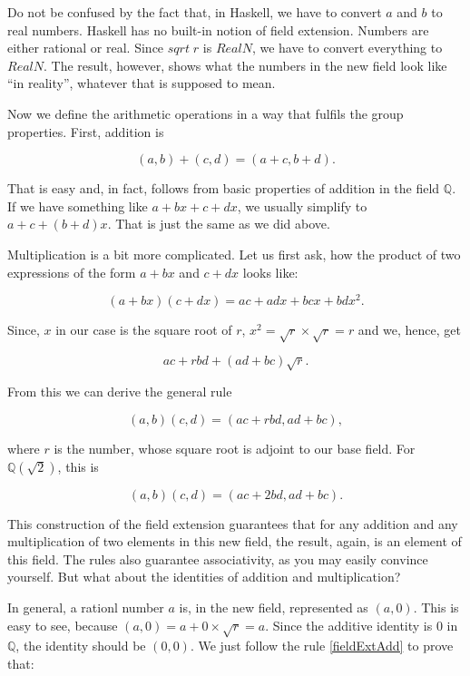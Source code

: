 \documentclass[tikz]{scrreprt}
\newcommand{\Conid}[1]{\mathit{#1}}
\newcommand{\Varid}[1]{\mathit{#1}}
\begin{document}
Do not be confused by the fact
that, in Haskell, we have to convert $a$ and $b$ to real numbers.
Haskell has no built-in notion of field extension.
Numbers are either rational or real. Since \ensuremath{\Varid{sqrt}\;\Varid{r}} is \ensuremath{\Conid{RealN}},
we have to convert
everything to \ensuremath{\Conid{RealN}}. The result, however, shows
what the numbers in the new field look like ``in reality'',
whatever that is supposed to mean.

Now we define the arithmetic operations in a way that fulfils 
the group properties. First, addition is

\begin{equation}\label{fieldExtAdd}
(a,b) + (c,d) = (a+c,b+d).
\end{equation}

That is easy and, in fact, follows from basic properties
of addition in the field $\mathbb{Q}$.
If we have something like $a+bx+c+dx$, we usually simplify to
$a+c+(b+d)x$. That is just the same as we did above.

Multiplication is a bit more complicated.
Let us first ask, how the product of two expressions
of the form $a+bx$ and $c+dx$ looks like:

\[
(a+bx)(c+dx)=ac+adx+bcx+bdx^2.
\]

Since, $x$ in our case is the square root of $r$, 
$x^2=\sqrt{r}\times\sqrt{r}=r$ 
and we, hence, get

\[
ac+rbd+(ad+bc)\sqrt{r}.
\]

From this we can derive the general rule

\begin{equation}\label{fieldExtMul}
(a,b)(c,d) = (ac+rbd,ad+bc),
\end{equation}

where $r$ is the number, whose square root is adjoint to our base field.
For $\mathbb{Q}(\sqrt{2})$, this is 

\begin{equation}
(a,b)(c,d) = (ac+2bd,ad+bc).
\end{equation}

This construction of the field extension guarantees
that for any addition and any multiplication 
of two elements in this new field, the result, again,
is an element of this field.
The rules also guarantee associativity,
as you may easily convince yourself.
But what about the identities of addition and multiplication?

In general, a rationl number $a$ is, in the new field,
represented as $(a,0)$.
This is easy to see, 
because $(a,0) = a+0\times\sqrt{r} = a$.
Since the additive identity is 0
in $\mathbb{Q}$, the identity should be $(0,0)$.
We just follow the rule \ref{fieldExtAdd}
to prove that:
\end{document}
